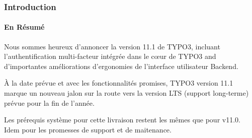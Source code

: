 %

\begin{frame}[fragile]
	\frametitle{Introduction}
	\framesubtitle{En Résumé}

	\small
		Nous sommes heureux d'annoncer la version 11.1 de TYPO3, incluant l'authentification multi-facteur
		intégrée dans le cœur de TYPO3 and d'importantes améliorations d'ergonomies de l'interface utilisateur Backend.

		\vspace{0.2cm}

		À la date prévue et avec les fonctionnalités promises, TYPO3 version 11.1
		marque un nouveau jalon sur la route vers la version LTS (support long-terme)
		prévue pour la fin de l'année.

		\vspace{0.2cm}

		Les prérequis système pour cette livraison restent les mêmes que pour v11.0.
		Idem pour les promesses de support et de maitenance.

	\normalsize

\end{frame}

